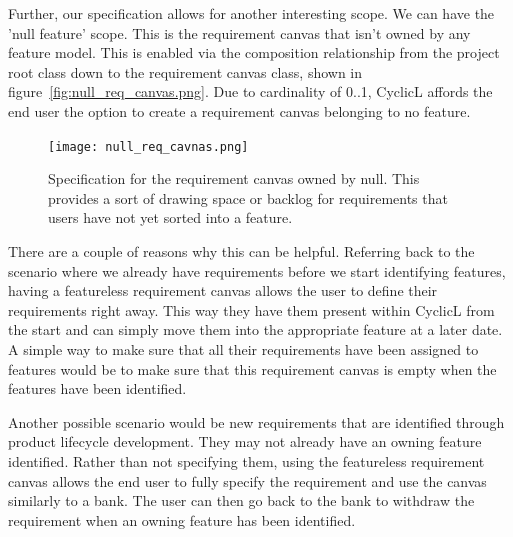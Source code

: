 Further, our specification allows for another interesting scope. We can have the 'null feature' scope. This is the requirement canvas that isn't owned by any feature model. This is enabled via the composition relationship from the project root class down to the requirement canvas class, shown in figure~\ref{fig:null_req_canvas.png}. Due to cardinality of 0..1, CyclicL affords the end user the option to create a requirement canvas belonging to no feature.

\begin{figure}[hbt!]
	\centering
	\texttt{[image: null\_req\_cavnas.png]}
	\caption{Specification for the requirement canvas owned by null. This provides a sort of drawing space or backlog for requirements that users have not yet sorted into a feature.}
	\label{fig:null_req_canvas}
\end{figure}

There are a couple of reasons why this can be helpful. Referring back to the scenario where we already have requirements before we start identifying features, having a featureless requirement canvas allows the user to define their requirements right away. This way they have them present within CyclicL from the start and can simply move them into the appropriate feature at a later date. A simple way to make sure that all their requirements have been assigned to features would be to make sure that this requirement canvas is empty when the features have been identified.

Another possible scenario would be new requirements that are identified through product lifecycle development. They may not already have an owning feature identified. Rather than not specifying them, using the featureless requirement canvas allows the end user to fully specify the requirement and use the canvas similarly to a bank. The user can then go back to the bank to withdraw the requirement when an owning feature has been identified. 




